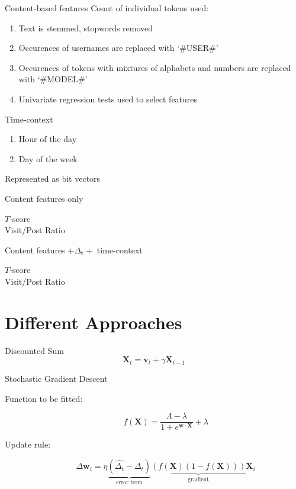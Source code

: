\documentclass[12pt]{presentation}
\newcommand{\vocab}{\mathbf{v}}
\newcommand{\dt}{\Delta_t}
\newcommand{\fvec}{\mathbf{X}}
\newcommand{\weights}{\mathbf{w}}
\newcommand{\X}{\mathbf{X}}
\begin{document}
\begin{frame}{Content-based features}
	Count of individual tokens used:
	\begin{enumerate}
		\item Text is stemmed, stopwords removed
		\item Occurences of usernames are replaced with `\#USER\#'
		\item Occurences of tokens with mixtures of alphabets and numbers are 
			replaced with `\#MODEL\#'
		\item Univariate regression tests used to select features
	\end{enumerate}
\end{frame}
\begin{frame}{Time-context}
	\begin{enumerate}
		\item Hour of the day
		\item Day of the week
	\end{enumerate}
	Represented as bit vectors
\end{frame}
\begin{frame}{Content features only}
	\begin{description}
		\item[$T$-score]
		\item[Visit/Post Ratio]
	\end{description}
\end{frame}
\begin{frame}{Content features $+ \Delta_\mathbf{t} + $ time-context}
\begin{description}
	\item[$T$-score]
	\item[Visit/Post Ratio]
\end{description}
\end{frame}

\section{Different Approaches}
\begin{frame}{Discounted Sum}
\[
	\fvec_t = \vocab_t + \gamma \fvec_{t-1}
\]
\end{frame}
\begin{frame}{Stochastic Gradient Descent}
\begin{description}
	\item[Function to be fitted:]
\[
	f(\X) = \frac{\Lambda-\lambda}{1 + e^{\weights \cdot \X}} + \lambda
\]
\item[Update rule:]
\[
	\Delta \weights_i = \eta
				\underbrace{\left(\widehat{\dt} - \dt \right)}_{\text{error term}}
				\underbrace{\left( f(\X)(1-f(\X)) \right)}_{\text{gradient}}
						\X_i
\]
\end{description}
\end{frame}
\end{document}
